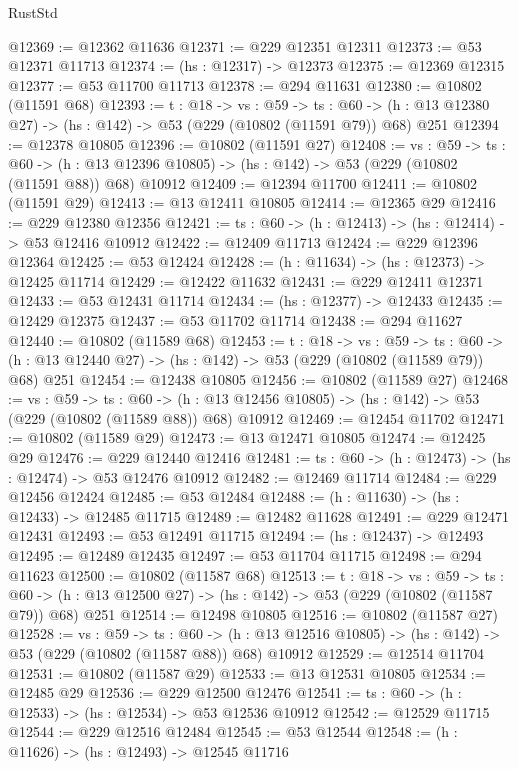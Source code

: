 \begin{lexlean}{RustStd}
\begin{coremodule}
@12369 := @12362 @11636
@12371 := @229 @12351 @12311
@12373 := @53 @12371 @11713
@12374 := (hs : @12317) -> @12373
@12375 := @12369 @12315
@12377 := @53 @11700 @11713
@12378 := @294 @11631
@12380 := @10802 (@11591 @68)
@12393 := {t : @18} ->
  {vs : @59} ->
  {ts : @60} -> (h : @13 @12380 @27) -> (hs : @142) -> @53 (@229 (@10802 (@11591 @79)) @68) @251
@12394 := @12378 @10805
@12396 := @10802 (@11591 @27)
@12408 := {vs : @59} ->
  {ts : @60} ->
  (h : @13 @12396 @10805) -> (hs : @142) -> @53 (@229 (@10802 (@11591 @88)) @68) @10912
@12409 := @12394 @11700
@12411 := @10802 (@11591 @29)
@12413 := @13 @12411 @10805
@12414 := @12365 @29
@12416 := @229 @12380 @12356
@12421 := {ts : @60} -> (h : @12413) -> (hs : @12414) -> @53 @12416 @10912
@12422 := @12409 @11713
@12424 := @229 @12396 @12364
@12425 := @53 @12424
@12428 := (h : @11634) -> (hs : @12373) -> @12425 @11714
@12429 := @12422 @11632
@12431 := @229 @12411 @12371
@12433 := @53 @12431 @11714
@12434 := (hs : @12377) -> @12433
@12435 := @12429 @12375
@12437 := @53 @11702 @11714
@12438 := @294 @11627
@12440 := @10802 (@11589 @68)
@12453 := {t : @18} ->
  {vs : @59} ->
  {ts : @60} -> (h : @13 @12440 @27) -> (hs : @142) -> @53 (@229 (@10802 (@11589 @79)) @68) @251
@12454 := @12438 @10805
@12456 := @10802 (@11589 @27)
@12468 := {vs : @59} ->
  {ts : @60} ->
  (h : @13 @12456 @10805) -> (hs : @142) -> @53 (@229 (@10802 (@11589 @88)) @68) @10912
@12469 := @12454 @11702
@12471 := @10802 (@11589 @29)
@12473 := @13 @12471 @10805
@12474 := @12425 @29
@12476 := @229 @12440 @12416
@12481 := {ts : @60} -> (h : @12473) -> (hs : @12474) -> @53 @12476 @10912
@12482 := @12469 @11714
@12484 := @229 @12456 @12424
@12485 := @53 @12484
@12488 := (h : @11630) -> (hs : @12433) -> @12485 @11715
@12489 := @12482 @11628
@12491 := @229 @12471 @12431
@12493 := @53 @12491 @11715
@12494 := (hs : @12437) -> @12493
@12495 := @12489 @12435
@12497 := @53 @11704 @11715
@12498 := @294 @11623
@12500 := @10802 (@11587 @68)
@12513 := {t : @18} ->
  {vs : @59} ->
  {ts : @60} -> (h : @13 @12500 @27) -> (hs : @142) -> @53 (@229 (@10802 (@11587 @79)) @68) @251
@12514 := @12498 @10805
@12516 := @10802 (@11587 @27)
@12528 := {vs : @59} ->
  {ts : @60} ->
  (h : @13 @12516 @10805) -> (hs : @142) -> @53 (@229 (@10802 (@11587 @88)) @68) @10912
@12529 := @12514 @11704
@12531 := @10802 (@11587 @29)
@12533 := @13 @12531 @10805
@12534 := @12485 @29
@12536 := @229 @12500 @12476
@12541 := {ts : @60} -> (h : @12533) -> (hs : @12534) -> @53 @12536 @10912
@12542 := @12529 @11715
@12544 := @229 @12516 @12484
@12545 := @53 @12544
@12548 := (h : @11626) -> (hs : @12493) -> @12545 @11716

\end{coremodule}
\end{lexlean}

